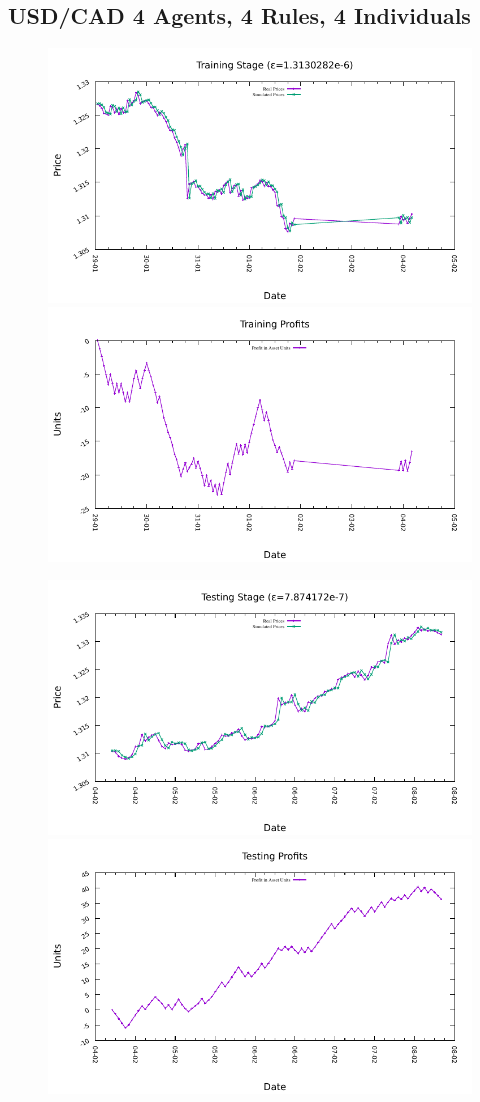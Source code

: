 








\subsection{USD/CAD 4 Agents, 4 Rules, 4 Individuals}
\label{results:forecast-usd-cad-4agents-4rules-4individuals}

\begin{figure}[htp]
  \centering

  \includegraphics[width=.45\textwidth]{img/plots/usd_cad_h1-4agents-4rules-4ind-100gen_training_fit.pdf}\quad
  \includegraphics[width=.45\textwidth]{img/plots/usd_cad_h1-4agents-4rules-4ind-100gen_training_profits.pdf}

  \medskip

  \includegraphics[width=.45\textwidth]{img/plots/usd_cad_h1-4agents-4rules-4ind-100gen_testing_fit.pdf}\quad
  \includegraphics[width=.45\textwidth]{img/plots/usd_cad_h1-4agents-4rules-4ind-100gen_testing_profits.pdf}


\end{figure}

